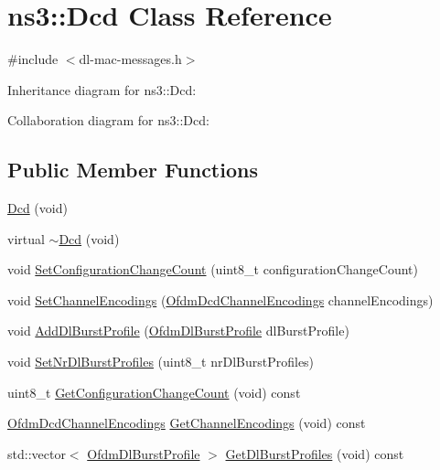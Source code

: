 \hypertarget{classns3_1_1Dcd}{}\section{ns3\+:\+:Dcd Class Reference}
\label{classns3_1_1Dcd}


{\ttfamily \#include $<$dl-\/mac-\/messages.\+h$>$}



Inheritance diagram for ns3\+:\+:Dcd\+:


Collaboration diagram for ns3\+:\+:Dcd\+:
\subsection*{Public Member Functions}
\begin{DoxyCompactItemize}
\item 
\hyperlink{classns3_1_1Dcd_afc6807cd85c3ba09b1daf67ab041f6cb}{Dcd} (void)
\item 
virtual \hyperlink{classns3_1_1Dcd_acffe02df9ff6d9b697ebb3dff5b320aa}{$\sim$\+Dcd} (void)
\item 
void \hyperlink{classns3_1_1Dcd_a155ef314ab289a14891cd7adc8ff03f9}{Set\+Configuration\+Change\+Count} (uint8\+\_\+t configuration\+Change\+Count)
\item 
void \hyperlink{classns3_1_1Dcd_ad3450345cea610fa5dc554661ad70cdc}{Set\+Channel\+Encodings} (\hyperlink{classns3_1_1OfdmDcdChannelEncodings}{Ofdm\+Dcd\+Channel\+Encodings} channel\+Encodings)
\item 
void \hyperlink{classns3_1_1Dcd_a65c69ddb068a02a3ce429855b256e872}{Add\+Dl\+Burst\+Profile} (\hyperlink{classns3_1_1OfdmDlBurstProfile}{Ofdm\+Dl\+Burst\+Profile} dl\+Burst\+Profile)
\item 
void \hyperlink{classns3_1_1Dcd_a26be492b234b5f28ab6ba9785e23fdf9}{Set\+Nr\+Dl\+Burst\+Profiles} (uint8\+\_\+t nr\+Dl\+Burst\+Profiles)
\item 
uint8\+\_\+t \hyperlink{classns3_1_1Dcd_a2ea8bbec4eb301581eeb68e346c48e35}{Get\+Configuration\+Change\+Count} (void) const 
\item 
\hyperlink{classns3_1_1OfdmDcdChannelEncodings}{Ofdm\+Dcd\+Channel\+Encodings} \hyperlink{classns3_1_1Dcd_a601c835f288de3c877a29dd158bc2719}{Get\+Channel\+Encodings} (void) const 
\item 
std\+::vector$<$ \hyperlink{classns3_1_1OfdmDlBurstProfile}{Ofdm\+Dl\+Burst\+Profile} $>$ \hyperlink{classns3_1_1Dcd_a04f4c31be69eabdfceb48be6fa811e45}{Get\+Dl\+Burst\+Profiles} (void) const 

\end{DoxyCompactItemize}

